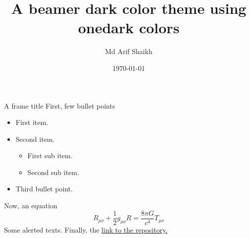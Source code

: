 \documentclass[aspectratio=169]{beamer}
\title{A beamer dark color theme using onedark colors}
\author{Md Arif Shaikh}
\institute{{\color{onecyan}International Centre for Theoretical Sciences, Bangalore, India}}
\date{\today}
\begin{document}
\thispagestyle{empty}
\maketitle

\begin{frame}
  {A frame title}
  First, few bullet points
  \begin{itemize}
  \item First item.
  \item Second item.
    \begin{itemize}
    \item First sub item.
    \item Second sub item.
    \end{itemize}
  \item Third bullet point.
  \end{itemize}
  Now, an equation
  \begin{equation}
    \label{eq:equation}
    R_{\mu\nu} + \frac{1}{2} g_{\mu\nu} R = \frac{8\pi G}{c^4} T_{\mu \nu}
  \end{equation}
  \alert{Some alerted texts}. Finally, the \href{https://github.com/md-arif-shaikh/beamer-one-dark}{link to the repository.}
\end{frame}
\end{document}
